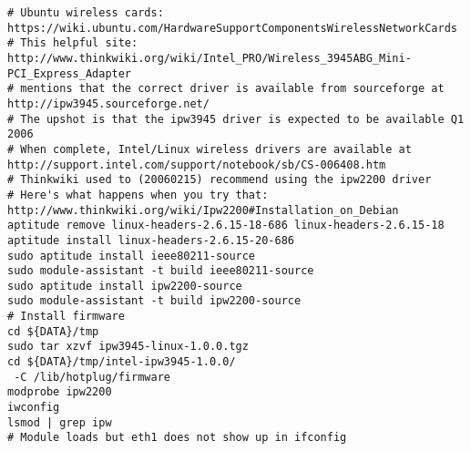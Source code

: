 \documentclass[12pt,twoside]{article}
\begin{document}
\begin{verbatim}
# Ubuntu wireless cards:
https://wiki.ubuntu.com/HardwareSupportComponentsWirelessNetworkCards
# This helpful site:
http://www.thinkwiki.org/wiki/Intel_PRO/Wireless_3945ABG_Mini-PCI_Express_Adapter
# mentions that the correct driver is available from sourceforge at
http://ipw3945.sourceforge.net/
# The upshot is that the ipw3945 driver is expected to be available Q1 2006
# When complete, Intel/Linux wireless drivers are available at
http://support.intel.com/support/notebook/sb/CS-006408.htm
# Thinkwiki used to (20060215) recommend using the ipw2200 driver
# Here's what happens when you try that:
http://www.thinkwiki.org/wiki/Ipw2200#Installation_on_Debian
aptitude remove linux-headers-2.6.15-18-686 linux-headers-2.6.15-18
aptitude install linux-headers-2.6.15-20-686
sudo aptitude install ieee80211-source 
sudo module-assistant -t build ieee80211-source 
sudo aptitude install ipw2200-source 
sudo module-assistant -t build ipw2200-source 
# Install firmware
cd ${DATA}/tmp
sudo tar xzvf ipw3945-linux-1.0.0.tgz
cd ${DATA}/tmp/intel-ipw3945-1.0.0/
 -C /lib/hotplug/firmware
modprobe ipw2200 
iwconfig 
lsmod | grep ipw
# Module loads but eth1 does not show up in ifconfig
\end{verbatim}
\end{document}
